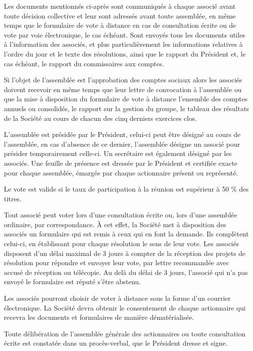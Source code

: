 \documentclass[a4paper,12pt]{report}
\begin{document}
Les documents mentionnés ci-après sont communiqués à chaque associé avant toute décision collective et leur sont adressés avant toute assemblée, en même temps que le formulaire de vote à distance en cas de consultation écrite ou de vote par voie électronique, le cas échéant. Sont envoyés tous les documents utiles à l'information des associés, et plus particulièrement les informations relatives à l'ordre du jour et le texte des résolutions, ainsi que le rapport du Président et, le cas échéant, le rapport du commissaires aux comptes.

Si l'objet de l'assemblée est l'approbation des comptes sociaux alors les associés doivent recevoir en même temps que leur lettre de convocation à l'assemblée ou que la mise à disposition du formulaire de vote à distance l'ensemble des comptes annuels ou consolidés, le rapport sur la gestion du groupe, le tableau des résultats de la Société au cours de chacun des cinq derniers exercices clos.

L'assemblée est présidée par le Président, celui-ci peut être désigné au cours de l'assemblée, en cas d'absence de ce dernier, l'assemblée désigne un associé pour présider temporairement celle-ci. Un secrétaire est également désigné par les associés. Une feuille de présence est dressée par le Président et certifiée exacte pour chaque assemblée, émargée par chaque actionnaire présent ou représenté.

Le vote est valide si le taux de participation à la réunion est supérieur à 50 \% des titres.

Tout associé peut voter lors d'une consultation écrite ou, lors d'une assemblée ordinaire, par correspondance. À cet effet, la Société met à disposition des associés un formulaire qui est remis à ceux qui en font la demande. Ils complètent celui-ci, en établissant pour chaque résolution le sens de leur vote. Les associés disposent d'un délai maximal de 3 jours à compter de la réception des projets de résolution pour répondre et envoyer leur vote, par lettre recommandée avec accusé de réception ou télécopie. Au delà du délai de 3 jours, l'associé qui n'a pas envoyé le formulaire est réputé s'être abstenu.

Les associés pourront choisir de voter à distance sous la forme d'un courrier électronique. La Société devra obtenir le consentement de chaque actionnaire qui recevra les documents et formulaires de manière dématérialisée.

Toute délibération de l'assemblée générale des actionnaires ou toute consultation écrite est constatée dans un procès-verbal, que le Président dresse et signe.
\end{document}
